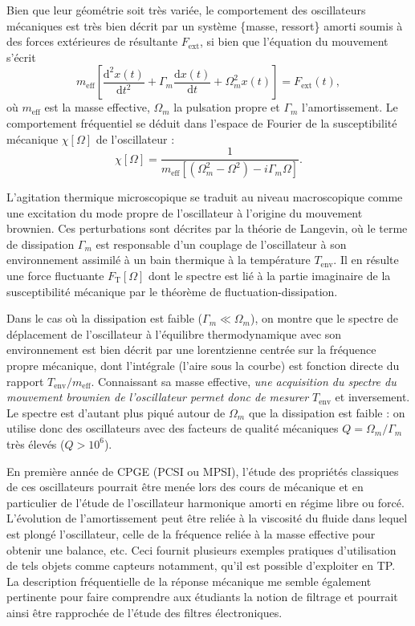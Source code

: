 \documentclass[12pt,a4paper]{article}
\renewcommand{\d}{\mathrm{d}}
\newenvironment{mep}{%
\addcontentsline{ldf}{figure}{0}%
\begin{mep_env}
\small}
{\end{mep_env}}
\begin{document}
Bien que leur géométrie soit très variée, le comportement des oscillateurs mécaniques est très bien décrit par un système \{masse, ressort\} amorti soumis à des forces extérieures de résultante $F_\mathrm{ext}$, si bien que l'équation du mouvement s'écrit
\begin{equation}
m_\mathrm{eff}\left[\frac{\d ^2 x(t)}{\d t^2} + \Gamma_m \frac{\d  x(t)}{\d t} +  \Omega_m^2 x(t)\right] = F_\mathrm{ext}(t),
\label{eq:eq_of_motion}
\end{equation}
où $m_\mathrm{eff}$ est la masse effective, $\Omega_m$ la pulsation propre et $\Gamma_m$ l'amortissement.
Le comportement fréquentiel se déduit dans l'espace de Fourier de la susceptibilité mécanique $\chi[\Omega]$ de l'oscillateur :
\begin{equation}
\chi[\Omega] = \frac{1}{m_\mathrm{eff}[(\Omega_m^2-\Omega^2)-i\Gamma_m\Omega]}.
\end{equation}

L'agitation thermique microscopique se traduit au niveau macroscopique comme une excitation du mode propre de l'oscillateur à l'origine du mouvement brownien.
Ces perturbations sont décrites par la théorie de Langevin, où le terme de dissipation $\Gamma_m$ est responsable d'un couplage de l'oscillateur à son environnement assimilé à un bain thermique à la température $T_\mathrm{env}$.
Il en résulte une force fluctuante $F_\mathrm{T}[\Omega]$ dont le spectre est lié à la partie imaginaire de la susceptibilité mécanique par le théorème de fluctuation-dissipation.

Dans le cas où la dissipation est faible ($\Gamma_m \ll \Omega_m$), on montre que le spectre de déplacement de l'oscillateur à l'équilibre thermodynamique avec son environnement est bien décrit par une lorentzienne centrée sur la fréquence propre mécanique, dont l'intégrale (l'aire sous la courbe) est fonction directe du rapport $T_\mathrm{env}/m_\mathrm{eff}$.
Connaissant sa masse effective, \textit{une acquisition du spectre du mouvement brownien de l'oscillateur permet donc de mesurer} $T_\mathrm{env}$ et inversement. 
Le spectre est d'autant plus piqué autour de $\Omega_m$ que la dissipation est faible : on utilise donc des oscillateurs avec des facteurs de qualité mécaniques $Q=\Omega_m/\Gamma_m$ très élevés ($Q>10^6$).

\begin{mep}
En première année de CPGE (PCSI ou MPSI), l'étude des propriétés classiques de ces oscillateurs pourrait être menée lors des cours de mécanique et en particulier de l'étude de l'oscillateur harmonique amorti en régime libre ou forcé.
L'évolution de l'amortissement peut être reliée à la viscosité du fluide dans lequel est plongé l'oscillateur, celle de la fréquence reliée à la masse effective pour obtenir une balance, etc.
Ceci fournit plusieurs exemples pratiques d'utilisation de tels objets comme capteurs notamment, qu'il est possible d'exploiter en TP.
La description fréquentielle de la réponse mécanique me semble également pertinente pour faire comprendre aux étudiants la notion de filtrage et pourrait ainsi être rapprochée de l'étude des filtres électroniques.
\end{mep}
\end{document}
